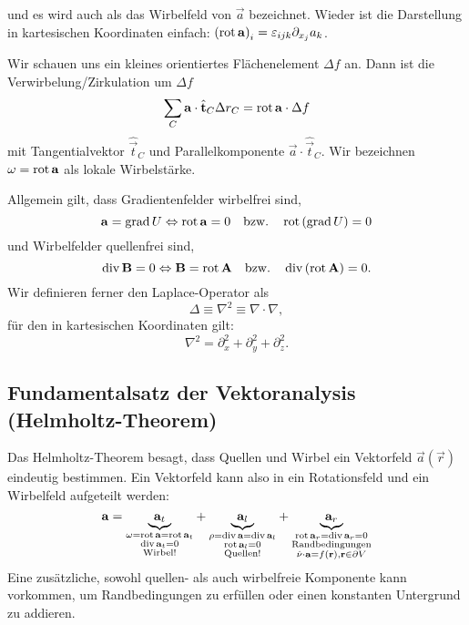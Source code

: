 und es wird auch als das Wirbelfeld von $\vec {a}$ bezeichnet. Wieder ist die Darstellung in kartesischen Koordinaten einfach: $\left(\operatorname{rot} \mathbf{a}\right)_{i}=\varepsilon _{ijk}\partial _{{x_{j}}}a_{k}$.

Wir schauen uns ein kleines orientiertes Flächenelement $\Delta  f$ an. Dann ist die Verwirbelung/Zirkulation um $\Delta  f$
\begin{equation*}
	\sum _{C}\mathbf{a}\cdot \hat{\mathbf{t}}_{C}\Delta  r_{C}=\operatorname{rot} \mathbf{a}\cdot \Delta  f
\end{equation*}
mit Tangentialvektor $\hat{\vec {t}}_{C}$ und Parallelkomponente $\vec {a}\cdot \hat{\vec {t}}_{C}$. Wir bezeichnen $\mathbf{\omega }=\operatorname{rot} \mathbf{a}$ als lokale Wirbelstärke.

Allgemein gilt, dass Gradientenfelder wirbelfrei sind,
\begin{equation*}
	\mathbf{a}=\operatorname{grad} U\Leftrightarrow \operatorname{rot} \mathbf{a}=0\quad\mathrm{bzw.}\quad  \operatorname{rot} \left(\operatorname{grad} U\right)=0
\end{equation*}
und Wirbelfelder quellenfrei sind,
\begin{equation*}
	\operatorname{div} \mathbf{B}=0\Leftrightarrow \mathbf{B}=\operatorname{rot} \mathbf{A}\quad\mathrm{bzw.}\quad  \operatorname{div} \left(\operatorname{rot} \mathbf{A}\right)=0.
\end{equation*}
Wir definieren ferner den Laplace-Operator als
\begin{equation*}
	\Delta  \equiv \nabla ^{2}\equiv \nabla \cdot \nabla ,
\end{equation*}
für den in kartesischen Koordinaten gilt:
\begin{equation*}
	\nabla ^{2}=\partial _{x}^{2}+\partial _{y}^{2}+\partial _{z}^{2}.
\end{equation*}
\subsection{Fundamentalsatz der Vektoranalysis (Helmholtz-Theorem)\label{ref-009}}

Das Helmholtz-Theorem besagt, dass Quellen und Wirbel ein Vektorfeld $\vec {a}\left(\vec {r}\right)$ eindeutig bestimmen. Ein Vektorfeld kann also in ein Rotationsfeld und ein Wirbelfeld aufgeteilt werden:
\begin{equation*}
	\mathbf{a}=\underset{\substack{
		    \omega =\operatorname{rot} \mathbf{a}=\operatorname{rot} \mathbf{a}_{t} \\
			\operatorname{div} \mathbf{a}_{t}=0 \\
			\text{Wirbel}!
		}}{\underbrace{\mathbf{a}_{t}}}+\underset{\substack{
			\rho =\operatorname{div} \mathbf{a}=\operatorname{div} \mathbf{a}_{l} \\
			\operatorname{rot} \mathbf{a}_{l}=0                     \\
			\text{Quellen}!
        }}{\underbrace{\mathbf{a}_{l}}}+\underset{\substack{
			\operatorname{rot} \mathbf{a}_{r}=\operatorname{div} \mathbf{a}_{r}=0 \\
			\text{Randbedingungen}                 \\
			\hat{\mathbf{\nu }}\cdot \mathbf{a}=f\left(\mathbf{r}\right),\mathbf{r}\in \partial V
	}}{\underbrace{\mathbf{a}_{r}}}
\end{equation*}
Eine zusätzliche, sowohl quellen- als auch wirbelfreie Komponente kann vorkommen, um Randbedingungen zu erfüllen oder einen konstanten Untergrund zu addieren.

